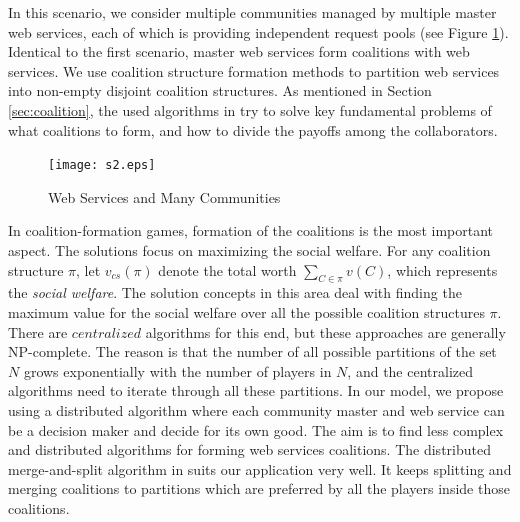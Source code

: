 \documentclass[10pt,journal,cspaper,compsoc]{IEEEtran}
\begin{document}
In this scenario, we consider multiple communities managed by
multiple master web services, each of which is providing
independent request pools (see Figure \ref{fig_sim2}). Identical
to the first scenario, master web services form coalitions with
web services. We use coalition structure formation methods to
partition web services into non-empty disjoint coalition
structures. As mentioned in Section \ref{sec:coalition}, the used
algorithms in \cite{Sandholm1999209,
DBLP:conf/ijcai/GrecoMPS11,DBLP:conf/ijcai/RahwanMJ11} try to
solve key fundamental problems of what coalitions to form, and how
to divide the payoffs among the collaborators.

\begin{figure}[!t]
\centering
\texttt{[image: s2.eps]}
\caption{Web Services and Many Communities}
\label{fig_sim2}
\end{figure}

In coalition-formation games, formation of the coalitions is the
most important aspect. The solutions focus on maximizing the
social welfare. For any coalition structure $\pi$, let
$v_{cs}(\pi)$ denote the total worth $\sum_{C \in \pi}{v(C)}$,
which represents the \emph{social welfare}. The solution concepts
in this area deal with finding the maximum value for the social
welfare over all the possible coalition structures $\pi$. There
are $centralized$ algorithms for this end, but these approaches
are generally NP-complete. The reason is that the number of all
possible partitions of the set $N$ grows exponentially with the
number of players in $N$, and the centralized algorithms need to
iterate through all these partitions.
In our model, we propose using a distributed algorithm where each
community master and web service can be a decision maker and
decide for its own good. The aim is to find less complex and
distributed algorithms for forming web services
coalitions\cite{DBLP:journals/igtr/AptW09,Dieckmann02dynamiccoalition,ray2007game}.
The distributed merge-and-split algorithm in
\cite{DBLP:journals/igtr/AptW09} suits our application very well.
It keeps splitting and merging coalitions to partitions which are
preferred by all the players inside those coalitions.
\end{document}

